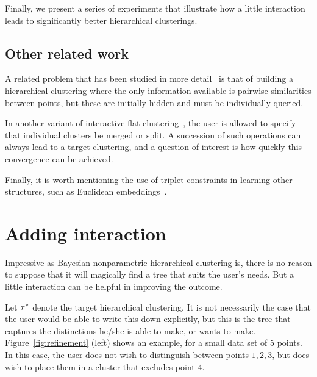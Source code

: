 Finally, we present a series of experiments that illustrate how a little interaction leads to significantly better hierarchical clusterings.


\subsection*{Other related work}

A related problem that has been studied in more detail~\citep{Zoller2000,Eriksson2011,Krishnamurthy2012} is that of building a hierarchical clustering where the only information available is pairwise similarities between points, but these are initially hidden and must be individually queried.

In another variant of interactive flat clustering~\citep{Balcan2008,Awasthi2010,Awasthi2013}, the user is allowed to specify that individual clusters be merged or split. A succession of such operations can always lead to a target clustering, and a question of interest is how quickly this convergence can be achieved.

Finally, it is worth mentioning the use of triplet constraints in learning other structures, such as Euclidean embeddings~\citep{Borg1997}.

\section{Adding interaction}

Impressive as Bayesian nonparametric hierarchical clustering is, there is no reason to suppose that it will magically find a tree that suits the user's needs. But a little interaction can be helpful in improving the outcome.

Let $\tau^*$ denote the target hierarchical clustering. It is not necessarily the case that the user would be able to write this down explicitly, but this is the tree that captures the distinctions he/she is able to make, or wants to make. Figure~\ref{fig:refinement} (left) shows an example, for a small data set of 5 points. In this case, the user does not wish to distinguish between points $1,2,3$, but does wish to place them in a cluster that excludes point $4$.

